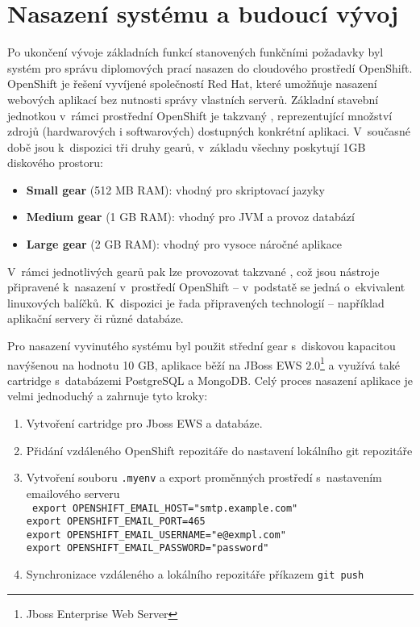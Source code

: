 \chapter{Nasazení systému a budoucí vývoj}
Po ukončení vývoje základních funkcí stanovených funkčními požadavky byl systém pro správu diplomových prací nasazen do cloudového prostředí OpenShift. OpenShift je  řešení vyvíjené společností Red Hat, které umožňuje nasazení webových aplikací bez nutnosti správy vlastních serverů. Základní stavební jednotkou v~rámci prostřední OpenShift je takzvaný , reprezentující množství zdrojů (hardwarových i softwarových) dostupných konkrétní aplikaci. V~současné době jsou k~dispozici tři druhy gearů, v~základu všechny poskytují 1GB diskového prostoru\cite{openshift-pricing}:

\begin{itemize}
\item \textbf{Small gear} (512 MB RAM): vhodný pro skriptovací jazyky
\item \textbf{Medium gear} (1 GB RAM): vhodný pro JVM a provoz databází
\item \textbf{Large gear} (2 GB RAM): vhodný pro vysoce náročné aplikace
\end{itemize}

V~rámci jednotlivých gearů pak lze provozovat takzvané , což jsou nástroje připravené k~nasazení v~prostředí OpenShift -- v~podstatě se jedná o~ekvivalent linuxových balíčků. K~dispozici je řada připravených technologií -- například aplikační servery či různé databáze.

Pro nasazení vyvinutého systému byl použit střední gear s~diskovou kapacitou navýšenou na hodnotu 10 GB, aplikace běží na JBoss EWS 2.0\footnote{Jboss Enterprise Web Server} a využívá také cartridge s~databázemi PostgreSQL a MongoDB. Celý proces nasazení aplikace je velmi jednoduchý a zahrnuje tyto kroky:

\begin{enumerate}
\item Vytvoření cartridge pro Jboss EWS a databáze.
\item Přidání vzdáleného OpenShift repozitáře do nastavení lokálního git repozitáře
\item Vytvoření souboru \texttt{.myenv} a export proměnných prostředí s~nastavením emailového serveru \\
\texttt{
export OPENSHIFT\_EMAIL\_HOST="smtp.example.com"\\
export OPENSHIFT\_EMAIL\_PORT=465\\
export OPENSHIFT\_EMAIL\_USERNAME="e@exmpl.com"\\
export OPENSHIFT\_EMAIL\_PASSWORD="password"\\
}
\item Synchronizace vzdáleného a lokálního repozitáře příkazem \texttt{git push}
\end{enumerate}

